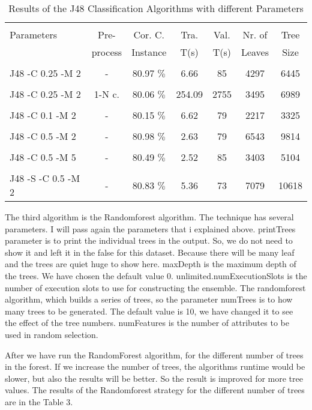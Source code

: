 \documentclass[a4paper]{article}
\begin{document}
\begin{table}
\begin{tabular}{|l| c | c | c | c |c |c |}

\hline & & & & & & \\
Parameters & Pre- & Cor. C.& Tra. & Val. & Nr. of  &  Tree  \\
 & process  & Instance & T(s) &  T(s) & Leaves & Size \\
\hline & & & & & & \\
J48 -C 0.25 -M 2 	 & - &			80.97  $\%$ & 6.66 & 85 & 4297  & 6445 \\ 
\hline & & & & & & \\
J48 -C 0.25 -M 2 	& 1-N c. &	80.06 $\%$ & 254.09 & 2755 & 3495  & 6989  \\ 
\hline & & & & & & \\
J48 -C 0.1 -M 2 	 & - &			80.15  $\%$ & 6.62 & 79 &  2217 & 3325\\ 
\hline & & & & & & \\
J48 -C 0.5 -M 2 	& - &			80.98 $\%$ & 2.63 & 79 &  6543 & 9814 \\ 
\hline & & & & & & \\
J48 -C 0.5 -M 5  	 & - &			80.49 $\%$ & 2.52 & 85 &  3403 & 5104 \\ 
\hline & & & & & & \\
J48 -S -C 0.5 -M 2 	& -&			 80.83 $\%$ & 5.36 &  73 & 7079 & 10618\\ 
\hline
\end{tabular}
\caption{Results of the J48 Classification Algorithms with different Parameters}
\end{table}

The third algorithm is the Randomforest algorithm. The technique has several parameters. I will pass again the parameters that i explained above. printTrees parameter is to print the individual trees in the output. So, we do not need to show it and left it in the false for this dataset. Because there will be many leaf and the trees are quiet huge to show here. maxDepth is the maximum depth of the trees. We have chosen the default value 0. unlimited.numExecutionSlots is the number of execution slots to use for constructing the ensemble. The randomforest algorithm, which builds a series of trees, so the parameter numTrees is to how many trees to be generated. The default value is 10, we have changed it to see the effect of the tree numbers. numFeatures is the number of attributes to be used in random selection. 

After we have run the RandomForest algorithm, for the different number of trees in the forest. If we increase the number of trees, the algorithms runtime would be slower, but also the results will be better. So the result is improved for more tree values. The results of the  Randomforest  strategy for the different number of trees are in the Table 3.
\end{document}

